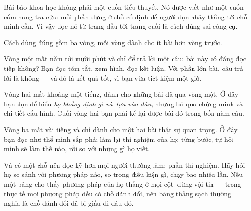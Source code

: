 \documentclass[../../english.tex]{subfiles}
\begin{document}
\begin{dongian}
Bài báo khoa học không phải một cuốn tiểu thuyết. Nó được viết như một cuốn cẩm nang tra cứu: mỗi phần đứng ở chỗ cố định để người đọc nhảy thẳng tới chỗ mình cần. Vì vậy đọc nó từ trang đầu tới trang cuối là cách dùng sai công cụ.

Cách dùng đúng gồm ba vòng, mỗi vòng dành cho ít bài hơn vòng trước.

Vòng một mất năm tới mười phút và chỉ để trả lời một câu: bài này có đáng đọc tiếp không? Bạn đọc tóm tắt, xem hình, đọc kết luận. Với phần lớn bài, câu trả lời là không --- và đó là kết quả tốt, vì bạn vừa tiết kiệm một giờ.

Vòng hai mất khoảng một tiếng, dành cho những bài đã qua vòng một. Ở đây bạn đọc để hiểu \emph{họ khẳng định gì và dựa vào đâu}, nhưng bỏ qua chứng minh và chi tiết cấu hình. Cuối vòng hai bạn phải kể lại được bài đó trong bốn năm câu.

Vòng ba mất vài tiếng và chỉ dành cho một hai bài thật sự quan trọng. Ở đây bạn đọc như thể mình sắp phải làm lại thí nghiệm của họ: từng bước, tự hỏi mình sẽ làm thế nào, rồi so với những gì họ viết.

Và có một chỗ nên đọc kỹ hơn mọi người thường làm: phần thí nghiệm. Hãy hỏi họ so sánh với phương pháp nào, so trong điều kiện gì, chạy bao nhiêu lần. Nếu một bảng cho thấy phương pháp của họ thắng ở mọi cột, đừng vội tin --- trong thực tế mọi phương pháp đều có chỗ đánh đổi, nên bảng thắng sạch thường nghĩa là chỗ đánh đổi đã bị giấu đi đâu đó.
\end{dongian}
\end{document}
